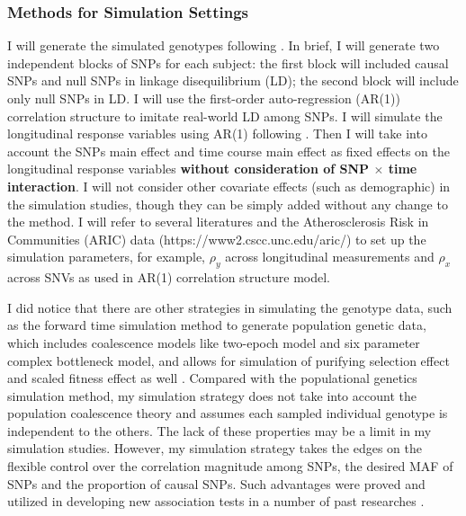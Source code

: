 \documentclass[12pt]{article}
\begin{document}
\subsubsection{Methods for Simulation Settings}\label{sec:subsub1-2}
I will generate the simulated genotypes following \cite{Wang2007,Pan2009,Basu2011}. In brief,
I will generate two independent blocks of SNPs for each subject: the
first block will included causal SNPs and null SNPs in linkage
disequilibrium (LD); the second block will include only null SNPs in LD. I will use the first-order auto-regression (AR(1)) correlation structure to imitate real-world LD among SNPs. I will simulate the longitudinal response variables using AR(1) following \cite{Song2013}. Then I will take into account the SNPs main effect and time course main effect as fixed effects on the longitudinal response variables \textbf{without consideration of SNP $\times$ time interaction}. I will not consider other covariate effects (such as demographic) in the simulation studies, though they can be simply added without any change to the method. I will refer to several literatures \cite{pan2014powerful,Basu2011,Pan2011,Han2010,Pan2009} and the Atherosclerosis Risk in Communities (ARIC) data (https://www2.cscc.unc.edu/aric/) to set up the simulation parameters, for example, $\rho_y$ across longitudinal measurements and $\rho_x$ across SNVs as used in AR(1) correlation structure model.

I did notice that there are other strategies in simulating the genotype data, such as the forward time simulation method to generate population genetic data, which includes coalescence models like two-epoch model and six parameter complex bottleneck model, and allows for simulation of purifying selection effect and scaled fitness effect as well \cite{Boyko2008,Hernandez2008}. Compared with the populational genetics simulation method, my simulation strategy does not take into account the population coalescence theory and assumes each sampled individual genotype is independent to the others. The lack of these properties may be a limit in my simulation studies. However, my simulation strategy takes the edges on the flexible control over the correlation magnitude among SNPs, the desired MAF of SNPs and the proportion of causal SNPs. Such advantages were proved and utilized in developing new association tests in a number of past researches \cite{Wang2007,Pan2009,Han2010,Pan2011,Basu2011,pan2014powerful,zhang2014testing}. 
\end{document}
